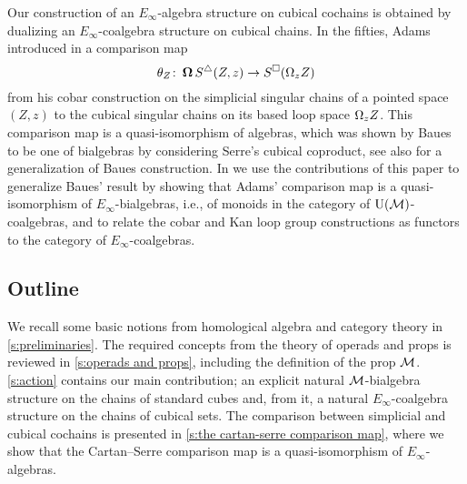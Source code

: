 Our construction of an $E_\infty$-algebra structure on cubical cochains is obtained by dualizing an $E_\infty$-coalgebra structure on cubical chains.
In the fifties, Adams introduced in \cite{adams1956cobar} a comparison map
\[
\theta_Z \colon \operatorname{\mathbf{\Omega}} S^\triangle(Z,z) \to S^\square(\Omega_z Z)
\]
from his cobar construction on the simplicial singular chains of a pointed space $(Z,z)$ to the cubical singular chains on its based loop space $\Omega_z Z$.
This comparison map is a quasi-isomorphism of algebras, which was shown by Baues \cite{baues1998hopf} to be one of bialgebras by considering Serre's cubical coproduct, see also \cite{galvez-carrilo202hopf1} for a generalization of Baues construction.
In \cite{medina2021cobar} we use the contributions of this paper to generalize Baues' result by showing that Adams' comparison map is a quasi-isomorphism of $E_\infty$-bialgebras, i.e., of monoids in the category of ${\operatorname{U}(\mathcal{M})}$-coalgebras, and to relate the cobar and Kan loop group constructions as functors to the category of $E_\infty$-coalgebras.

\subsection*{Outline}

We recall some basic notions from homological algebra and category theory in \cref{s:preliminaries}.
The required concepts from the theory of operads and props is reviewed in \cref{s:operads and props}, including the definition of the prop $\mathcal{M}$.
\cref{s:action} contains our main contribution; an explicit natural $\mathcal{M}$-bialgebra structure on the chains of standard cubes and, from it, a natural $E_\infty$-coalgebra structure on the chains of cubical sets.
The comparison between simplicial and cubical cochains is presented in \cref{s:the cartan-serre comparison map}, where we show that the Cartan--Serre comparison map is a quasi-isomorphism of $E_\infty$-algebras.